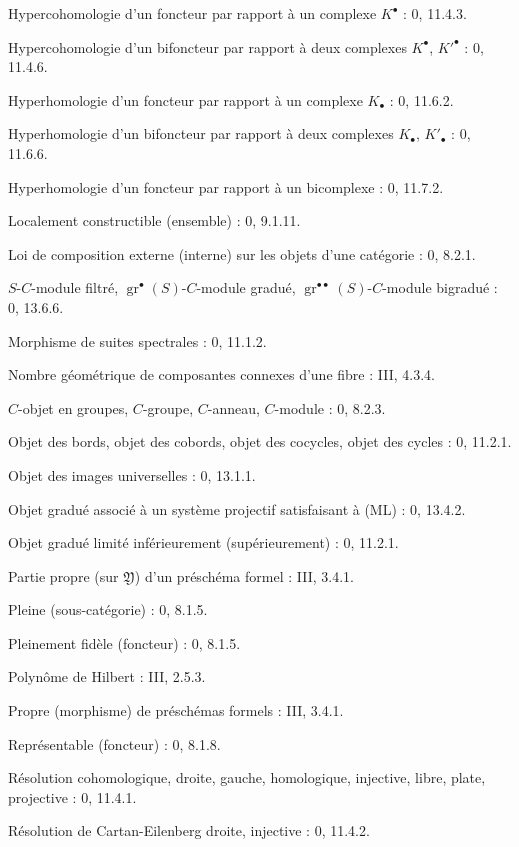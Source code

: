 \begin{flushleft}
Hypercohomologie d'un foncteur par rapport à un complexe $K^\bullet$ :
0, 11.4.3.

Hypercohomologie d'un bifoncteur par rapport à deux complexes
$K^\bullet$, $K'^{\bullet}$ : 0, 11.4.6.

Hyperhomologie d'un foncteur par rapport à un complexe $K_\bullet$ :
0, 11.6.2.

Hyperhomologie d'un bifoncteur par rapport à deux complexes $K_\bullet$,
$K'_\bullet$ : 0, 11.6.6.

Hyperhomologie d'un foncteur par rapport à un bicomplexe : 0, 11.7.2.

Localement constructible (ensemble) : 0, 9.1.11.

Loi de composition externe (interne) sur les objets d'une catégorie :
0, 8.2.1.


$S$-$C$-module filtré, $\operatorname{gr}^\bullet(S)$-$C$-module gradué,
$\operatorname{gr}^{\bullet\bullet}(S)$-$C$-module bigradué : 0, 13.6.6.

Morphisme de suites spectrales : 0, 11.1.2.

Nombre géométrique de composantes connexes d'une fibre : III, 4.3.4.

$C$-objet en groupes, $C$-groupe, $C$-anneau, $C$-module : 0, 8.2.3.

Objet des bords, objet des cobords, objet des cocycles, objet des cycles :
0, 11.2.1.

Objet des images universelles : 0, 13.1.1.

Objet gradué associé à un système projectif satisfaisant à (ML) : 0, 13.4.2.

Objet gradué limité inférieurement (supérieurement) : 0, 11.2.1.

Partie propre (sur $\mathfrak Y$) d'un préschéma formel : III, 3.4.1.

Pleine (sous-catégorie) : 0, 8.1.5.

Pleinement fidèle (foncteur) : 0, 8.1.5.

Polynôme de Hilbert : III, 2.5.3.

Propre (morphisme) de préschémas formels : III, 3.4.1.

Représentable (foncteur) : 0, 8.1.8.

Résolution cohomologique, droite, gauche, homologique, injective, libre,
plate, projective : 0, 11.4.1.

Résolution de Cartan-Eilenberg droite, injective : 0, 11.4.2.


\end{flushleft}
